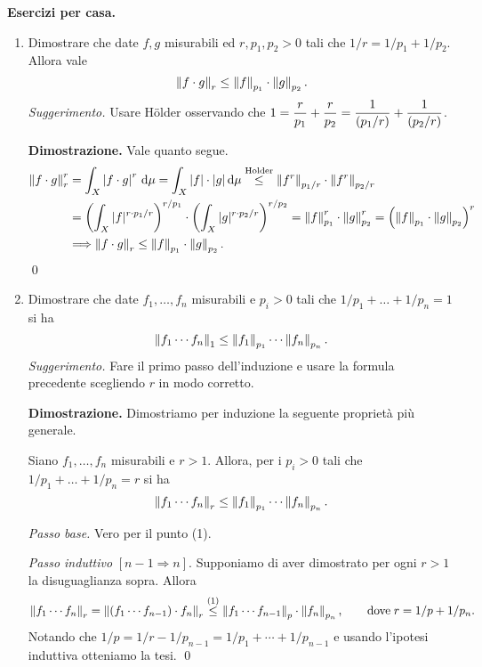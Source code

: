 \textbf{Esercizi per casa.}
\begin{enumerate}[label=(\arabic*)]

\item Dimostrare che date $f,g$ misurabili ed $r,p_1,p_2 > 0$ tali che  $1 / r = 1 / p_1 + 1 / p_2$.
Allora vale
$$
	\left\lVert  f \cdot g  \right\rVert_r \leq \left\lVert  f  \right\rVert_{p_1} \cdot \left\lVert  g  \right\rVert_{p_2}.
$$
\textit{Suggerimento.} Usare Hölder osservando che $\displaystyle 1 = \frac{r}{p_1} + \frac{r}{p_2} = \frac{1}{\left( p_1/r \right)} + \frac{1}{\left( p_2/r \right)}$.

\textbf{Dimostrazione.} Vale quanto segue.
\begin{align*}
	\left\lVert f \cdot g \right\rVert_r^r 
	&= \int_X \left| f \cdot g \right|^r \,\mathrm{d} \mu
	= \int_X |f| \cdot |g| \,\mathrm{d} \mu
	\overset{\text{Holder}}{\leq} \left\lVert f^r \right\rVert_{p_1 / r} \cdot \left\lVert f^r \right\rVert_{p_2 / r} \\
	& = \left( \int_X |f|^{r \cdot p_1 / r} \right)^{r / p_1} \cdot \left( \int_X |g|^{r \cdot p_2 / r} \right)^{r / p_2}
	= \left\lVert f \right\rVert_{p_1}^r \cdot \left\lVert g \right\rVert_{p_2}^r
	= \left( \left\lVert f \right\rVert_{p_1} \cdot \left\lVert g \right\rVert_{p_2} \right)^r \\
	& \Longrightarrow \left\lVert f \cdot g \right\rVert_r \leq \left\lVert f \right\rVert_{p_1} \cdot \left\lVert g \right\rVert_{p_2}.
\end{align*}
\qed

\item Dimostrare che date $f_1,\ldots, f_n$ misurabili e $p_i > 0$ tali che $1/p_1 + \ldots + 1/p_n = 1$ si ha
$$
	\left\lVert  f_1 \cdots f_n  \right\rVert_1 \leq \left\lVert  f_1  \right\rVert_{p_1} \cdots \left\lVert  f_n  \right\rVert_{p_n}.
$$
\textit{Suggerimento.} Fare il primo passo dell'induzione e usare la formula precedente scegliendo $r$ in modo corretto.

\textbf{Dimostrazione.} Dimostriamo per induzione la seguente proprietà più generale.

Siano $f_1,\ldots, f_n$ misurabili e $r > 1$. Allora, per i $p_i > 0$ tali che $1/p_1 + \ldots + 1/p_n = r$ si ha
$$
	\left\lVert  f_1 \cdots f_n  \right\rVert_r \leq \left\lVert  f_1  \right\rVert_{p_1} \cdots \left\lVert  f_n  \right\rVert_{p_n}.
$$

\textit{Passo base.} Vero per il punto (1).

\textit{Passo induttivo} $[n-1 \Rightarrow n]$. Supponiamo di aver dimostrato per ogni $r > 1$ la disuguaglianza sopra. Allora
%
$$
\left\lVert f_1 \cdots f_n \right\rVert_r 
= \left\lVert (f_1 \cdots f_{n-1}) \cdot f_n \right\rVert_r 
\overset{(1)}{\leq} \left\lVert f_1 \cdots f_{n-1} \right\rVert_p \cdot \left\lVert f_n \right\rVert_{p_n}, \qquad \text{dove} \; r = 1/p + 1/p_n.
$$
%
Notando che $1/p = 1/r - 1/p_{n-1} = 1/p_1 + \cdots + 1/p_{n-1}$ e usando l'ipotesi induttiva otteniamo la tesi.
\qed

\end{enumerate}
